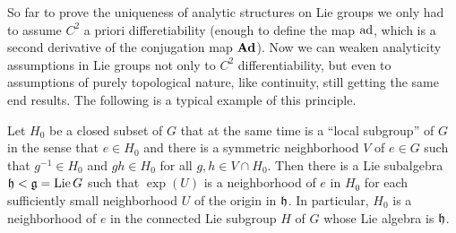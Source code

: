 So far to prove the uniqueness of analytic structures on Lie groups we only had to assume $C^2$ a priori differetiability (enough to define the map $\mathrm{ad}$, which is a second derivative of the conjugation map $\mathrm{\mathbf{Ad}}$). Now we can weaken analyticity assumptions in Lie groups not only to $C^2$ differentiability, but even to assumptions of purely topological nature, like continuity, still getting the same end results. The following is a typical example of this principle.

\begin{thm}[{{\cite[Thm~1.10.6]{DK}}}]\label{thm 1.10.6 DK}
    Let $H_0$ be a closed subset of $G$ that at the same time is a ``local subgroup'' of $G$ in the sense that $e\in H_0$ and there is a symmetric neighborhood $V$ of $e\in G$ such that $g^{-1}\in H_0$ and $gh\in H_0$ for all $g,h\in V\cap H_0$. Then there is a Lie subalgebra $\mathfrak{h}<\mathfrak{g}=\operatorname{Lie} G$ such that $\exp(U)$ is a neighborhood of $e$ in $H_0$ for each sufficiently small neighborhood $U$ of the origin in $\mathfrak{h}$. In particular, $H_0$ is a neighborhood of $e$ in the connected Lie subgroup $H$ of $G$ whose Lie algebra is $\mathfrak{h}$.
\end{thm}
